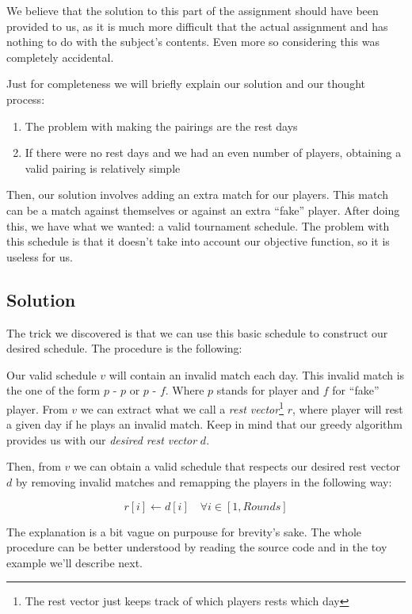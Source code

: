 \documentclass[a4paper, 10pt]{article}
\begin{document}
We believe that the solution to this part of the assignment should have been provided to us, as it is much more difficult that the actual assignment and has nothing to do with the subject's contents. Even more so considering this was completely accidental.


Just for completeness we will briefly explain our solution and our thought process:

\begin{enumerate}
    \item The problem with making the pairings are the rest days
    \item If there were no rest days and we had an even number of players, obtaining a valid pairing is relatively simple
\end{enumerate}

Then, our solution involves adding an extra match for our players. This match can be a match against themselves or against an extra ``fake'' player. After doing this, we have what we wanted: a valid tournament schedule. The problem with this schedule is that it doesn't take into account our objective function, so it is useless for us.


\subsection{Solution}
The trick we discovered is that we can use this basic schedule to construct our desired schedule. The procedure is the following:

Our valid schedule $v$ will contain an invalid match each day. This invalid match is the one of the form $p$ - $p$ or $p$ - $f$. Where $p$ stands for player and $f$ for ``fake'' player. From $v$ we can extract what we call a \textit{rest vector}\footnote{The rest vector just keeps track of which players rests which day} $r$, where player will rest a given day if he plays an invalid match. Keep in mind that our greedy algorithm provides us with our \textit{desired rest vector} $d$.

Then, from $v$ we can obtain a valid schedule that respects our desired rest vector $d$ by removing invalid matches and remapping the players in the following way:


\begin{equation}
    \label{eq:remap}
    r[i] \leftarrow d[i] \quad \forall i \in [1, Rounds]
\end{equation}

The explanation is a bit vague on purpouse for brevity's sake. The whole procedure can be better understood by reading the source code and in the toy example we'll describe next.
\end{document}
